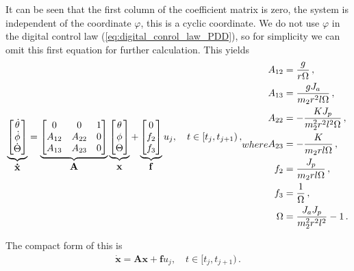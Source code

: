 \noindent
It can be seen that the first column of the coefficient matrix is zero, the system is independent of the coordinate $\varphi$, this is a cyclic coordinate. We do not use $\varphi$ in the digital control law (\ref{eq:digital_conrol_law_PDD}), so for simplicity we can omit this first equation for further calculation. 
This yields 
\begin{subequations}
	
\begin{align}
	\underbrace{\begin{bmatrix}
		\dot \theta		\\
		\dot \phi		\\
		\dot \Theta
	\end{bmatrix}}_{\displaystyle \mathbf{\dot x}}
	= 
	\underbrace{\begin{bmatrix}
		 0 & 0 & 1 \\
		 A_{12} & A_{22} & 0 \\
		 A_{13} & A_{23} & 0 \\
	\end{bmatrix}}_{\displaystyle \mathbf A}
	\underbrace{\begin{bmatrix}
		\theta		\\
		\phi		\\
		\Theta
	\end{bmatrix}}_{\displaystyle \mathbf x\vphantom{A}} + 
	\underbrace{\begin{bmatrix}
		0\\
		f_2\\
		f_3
	\end{bmatrix}}_{\displaystyle \mathbf f}
	u_j,\quad t\in[t_{j},t_{j+1})\,,
\end{align}

\noindent where
\begin{align}
	A_{12} &= \dfrac{g}{r\Omega}\,,
	\\
	A_{13} &= \dfrac{g J_a} {m_2r^2l\Omega}\,,
	\\
	A_{22} &= -\dfrac{K J_p} {m_2^2r^2l^2\Omega}\,,
	\\
	A_{23} &= -\dfrac{K} {m_2rl\Omega}\,,
	\\
	f_2 &= \dfrac{J_p}{m_2rl\Omega}\,,
	\\
	f_3 &=\dfrac{1}{\Omega}\,,
	\\
	\Omega &= \dfrac{J_aJ_p}{m_2^2r^2l^2}-1\,.
\end{align}
\end{subequations}

\noindent The compact form of this is
\begin{align}
	\mathbf{\dot x}=\mathbf A\mathbf x + \mathbf f u_j,\quad t\in[t_{j},t_{j+1})\,.
\end{align}


